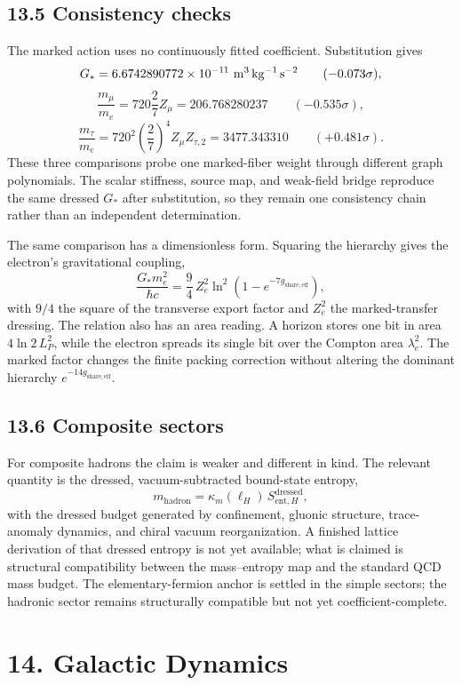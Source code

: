 \documentclass[11pt]{article}
\begin{document}
\subsection{13.5 Consistency checks}

The marked action uses no continuously fitted coefficient. Substitution gives
\[
G_*=6.6742890772\times10^{-11}\ {\rm m^3\,kg^{-1}\,s^{-2}}
\qquad(-0.073\sigma),
\]
\[
\frac{m_\mu}{m_e}
=720\frac27Z_\mu
=206.768280237
\qquad(-0.535\sigma),
\]
\[
\frac{m_\tau}{m_e}
=720^2\left(\frac27\right)^4Z_\mu Z_{\tau,2}
=3477.343310
\qquad(+0.481\sigma).
\]
These three comparisons probe one marked-fiber weight through different graph polynomials. The scalar stiffness, source map, and weak-field bridge reproduce the same dressed $G_*$ after substitution, so they remain one consistency chain rather than an independent determination.

The same comparison has a dimensionless form. Squaring the hierarchy gives the electron's gravitational coupling,
\[
\frac{G_*m_e^2}{\hbar c}
=\frac94\,Z_e^2\ln^2\!\left(1-e^{-7g_{\mathrm{share,eff}}}\right),
\]
with $9/4$ the square of the transverse export factor and $Z_e^2$ the marked-transfer dressing. The relation also has an area reading. A horizon stores one bit in area $4\ln2\,L_P^2$, while the electron spreads its single bit over the Compton area $\lambda_e^2$. The marked factor changes the finite packing correction without altering the dominant hierarchy $e^{-14g_{\mathrm{share,eff}}}$.

\subsection{13.6 Composite sectors}

For composite hadrons the claim is weaker and different in kind. The relevant quantity is the dressed, vacuum-subtracted bound-state entropy,
\[
m_{\mathrm{hadron}}=\kappa_m(\ell_H)\,S_{\mathrm{ent},H}^{\mathrm{dressed}},
\]
with the dressed budget generated by confinement, gluonic structure, trace-anomaly dynamics, and chiral vacuum reorganization. A finished lattice derivation of that dressed entropy is not yet available; what is claimed is structural compatibility between the mass--entropy map and the standard QCD mass budget. The elementary-fermion anchor is settled in the simple sectors; the hadronic sector remains structurally compatible but not yet coefficient-complete.

\section{14. Galactic Dynamics}
\end{document}
